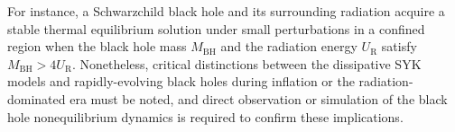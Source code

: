 \documentclass[prl,superscriptaddress,notitlepage,showpacs,twocolumn]{revtex4-2}
\begin{document}
For instance, a Schwarzchild black hole and its surrounding radiation acquire a stable thermal equilibrium solution under small perturbations in a confined region when the black hole mass $M_{\mathrm{BH}}$ and the radiation energy $U_{\mathrm{R}}$ satisfy $M_{\mathrm{BH}}>4U_{\mathrm{R}}$. %
Nonetheless, critical distinctions between the dissipative SYK models and rapidly-evolving black holes during inflation or the radiation-dominated era must be noted, and direct observation or simulation of the black hole nonequilibrium dynamics is required to confirm these implications. 

\end{document}
